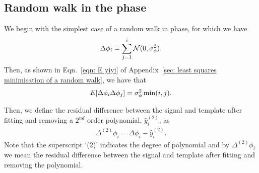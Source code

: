\documentclass[../full_thesis/full_thesis.tex]{subfiles}
\begin{document}
\subsection{Random walk in the phase}
\label{sec: minimised rw in phase}
We begin with the simplest case of a random walk in phase, for which we have
\begin{equation}
\Delta\phi_{i} = \sum_{j=1}^{i}\mathcal{N}(0, \sigma_{\phi}^{2}).
\end{equation}
Then, as shown in Eqn.~\eqref{eqn: E yiyi} of Appendix~\ref{sec: least squares
minimisation of a random walk}, we have that
\begin{equation}
E[\Delta\phi_{i} \Delta\phi_{j}] = \sigma_{\phi}^{2} \min(i, j).
\end{equation}

Then, we define the residual difference between the signal and template
after fitting and removing a $2^{nd}$ order polynomial, $\hat{y}_i^{(2)}$, as
\begin{align}
\Delta^{(2)}\phi_i = \Delta\phi_i - \hat{y}_i^{(2)}.
\label{eqn: D2phi}
\end{align}
Note that the superscript `(2)' indicates the degree of polynomial and by
$\Delta^{(2)}\phi_i$ we mean the residual difference between the signal and
template after fitting and removing the polynomial.
\end{document}
